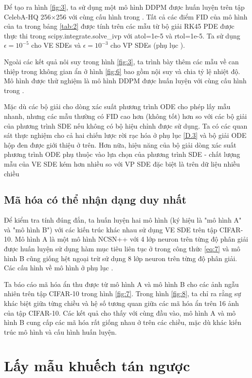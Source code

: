 \documentclass{article} %
\begin{document}
Để tạo ra hình \ref{fig:3}, ta sử dụng một mô hình DDPM được huấn luyện trên tập CelebA-HQ 256$\times$256 với cùng cấu hình trong \citep{ho2020denoising}.
Tất cả các điểm FID của mô hình của ta trong bảng \ref{tab:2} được tính trên các mẫu từ bộ giải RK45 PDE được thực thi trong scipy.integrate.solve\_ivp với atol=1e-5 và rtol=1e-5.
Ta sử dụng $\epsilon=10^{-5}$ cho VE SDEs và $\epsilon=10^{-3}$ cho VP SDEs (phụ lục ).

Ngoài các kết quả nôi suy trong hình \ref{fig:3}, ta trình bày thêm các mẫu về can thiệp trong không gian ẩn ở hình \ref{fig:6} bao gồm nội suy và chia tỷ lệ nhiệt độ.
Mô hình được thử nghiệm là mô hình DDPM được huấn luyện với cùng cấu hình trong \citep{ho2020denoising}.

Mặc dù các bộ giải cho dòng xác suất phương trình ODE cho phép lấy mẫu nhanh, nhưng các mẫu thường có FID cao hơn (không tốt) hơn so với các bộ giải của phương trình SDE nếu không có bộ hiệu chỉnh được sử dụng.
Ta có các quan sát thực nghiệm cho cả hai chiến lược rời rạc hóa ở phụ lục \ref{D.3} và bộ giải ODE hộp đen được giới thiệu ở trên.
Hơn nữa, hiệu năng của bộ giải dòng xác suất phương trình ODE phụ thuộc vào lựa chọn của phương trình SDE - chất lượng mẫu của VE SDE kém hơn nhiều so với VP SDE đặc biệt là trên dữ liệu nhiều chiều 


\subsection{Mã hóa có thể nhận dạng duy nhất} \label{D.5}

Để kiểm tra tính đúng đắn, ta huấn luyện hai mô hình (ký hiệu là "mô hình A" và "mô hình B") với các kiến trúc khác nhau sử dụng VE SDE trên tập CIFAR-10.
Mô hình A là một mô hình NCSN++ với 4 lớp neuron trên từng độ phân giải được huấn luyện sử dụng hàm mục tiêu liên tục ở trong công thức \ref{eq:7} và mô hình B cũng giống hệt ngoại trừ sử dụng 8 lớp neuron trên từng độ phân giải.
Các cấu hình về mô hình ở phụ lục .

Ta báo cáo mã hóa ẩn thu được từ mô hình A và mô hình B cho các ảnh ngẫu nhiên trên tập CIFAR-10 trong hình \ref{fig:7}.
Trong hình \ref{fig:8}, ta chỉ ra rằng sự khác biệt giữa từng chiều và hệ số tương quan giữa các mã hóa ẩn trên 16 ảnh của tập CIFAR-10.
Các kết quả cho thấy với cùng đầu vào, mô hình A và mô hình B cung cấp các mã hóa rất giống nhau ở trên các chiều, mặc dù khác kiến trúc mô hình và cấu hình huấn luyện.

\section{Lấy mẫu khuếch tán ngược} \label{E}
\end{document}
